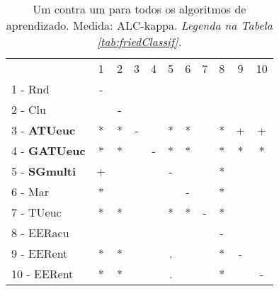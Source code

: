\begin{table}[h]
\caption{Um contra um para todos os algoritmos de aprendizado. Medida: ALC-kappa. \textit{Legenda na Tabela \ref{tab:friedClassif}.}}
\begin{center}\begin{tabular}{lcc|cc|cc|cc|cc}
 			& 1 & 2 & 3 & 4 & 5 & 6 & 7 & 8 & 9 & 10\\
1 - Rnd  	& - &   &   &   &   &   &   &   &   &   \\
2 - Clu  	&   & - &   &   &   &   &   &   &   &   \\ \hline
3 - \textbf{ATUeuc}	& * & * & - &   & * & * &   & * & + & + \\
4 - \textbf{GATUeuc}	& * & * &   & - & * & * &   & * & * & * \\ \hline
5 - \textbf{SGmulti}	& + &   &   &   & - &   &   & * &   &   \\
6 - Mar  	& * &   &   &   &   & - &   & * &   &   \\ \hline
7 - TUeuc	& * & * &   &   & * & * & - & * &   &   \\
8 - EERacu	&   &   &   &   &   &   &   & - &   &   \\ \hline
9 - EERent	& * & * &   &   & . &   &   & * & - &   \\
10 - EERent	& * & * &   &   & . &   &   & * &   & - \\ \hline\end{tabular}
\label{stratsALCKappaFriedAllReduxhalf}
\end{center}
\end{table}
